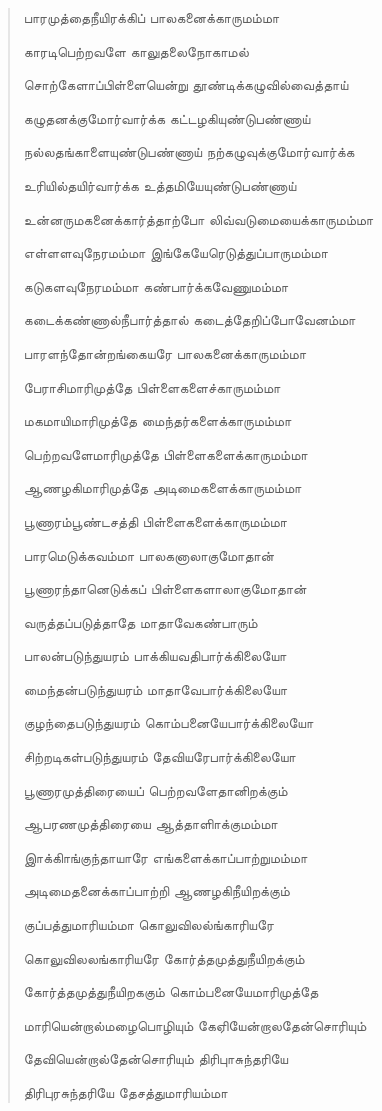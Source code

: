 \documentclass{article}
\begin{document}
\begin{quotation}
{பாரமுத்தைநீயிரக்கிப் பாலகனைக்காருமம்மா

காரடிபெற்றவளே காலுதலைநோகாமல்

சொற்கேளாப்பிள்ளையென்று தூண்டிக்கழுவில்வைத்தாய்

கழுதனக்குமோர்வார்க்க கட்டழகியுண்டுபண்ணாய்

நல்லதங்காளையுண்டுபண்ணாய் நற்கழுவுக்குமோர்வார்க்க

உரியில்தயிர்வார்க்க உத்தமியேயுண்டுபண்ணாய்

உன்னருமகனைக்கார்த்தாற்போ லிவ்வடுமையைக்காருமம்மா

எள்ளளவுநேரமம்மா இங்கேயேரெடுத்துப்பாருமம்மா

கடுகளவுநேரமம்மா கண்பார்க்கவேணுமம்மா

கடைக்கண்ணால்நீபார்த்தால் கடைத்தேறிப்போவேனம்மா

பாரளந்தோன்றங்கையரே பாலகனைக்காருமம்மா

பேராசிமாரிமுத்தே பிள்ளைகளைச்காருமம்மா

மகமாயிமாரிமுத்தே மைந்தர்களைக்காருமம்மா

பெற்றவளேமாரிமுத்தே பிள்ளைகளைக்காருமம்மா

ஆணழகிமாரிமுத்தே அடிமைகளைக்காருமம்மா

பூணாரம்பூண்டசத்தி பிள்ளைகளைக்காருமம்மா

பாரமெடுக்கவம்மா பாலகனாலாகுமோதான்

பூணாரந்தானெடுக்கப் பிள்ளைகளாலாகுமோதான்

வருத்தப்படுத்தாதே மாதாவேகண்பாரும்

பாலன்படுந்துயரம் பாக்கியவதிபார்க்கிலையோ

மைந்தன்படுந்துயரம் மாதாவேபார்க்கிலையோ

குழந்தைபடுந்துயரம் கொம்பனையேபார்க்கிலையோ

சிற்றடிகள்படுந்துயரம் தேவியரேபார்க்கிலையோ

பூணாரமுத்திரையைப் பெற்றவளேதானிறக்கும்

ஆபரணமுத்திரையை ஆத்தாளிாக்குமம்மா

இாக்கிாங்குந்தாயாரே எங்களைக்காப்பாற்றுமம்மா

அடிமைதனைக்காப்பாற்றி ஆணழகிநீயிறக்கும்

குப்பத்துமாரியம்மா கொலுவிலல்ங்காரியரே

கொலுவிலலங்காரியரே கோர்த்தமுத்துநீயிறக்கும்

கோர்த்தமுத்துநீயிறககும் கொம்பனையேமாரிமுத்தே

மாரியென்றால்மழைபொழியும் கேஏியேன்றாலதேன்சொரியும்

தேவியென்றால்தேன்சொரியும் திரிபுாசுந்தரியே

திரிபுரசுந்தரியே தேசத்துமாரியம்மா

}
\end{quotation}
\end{document}
